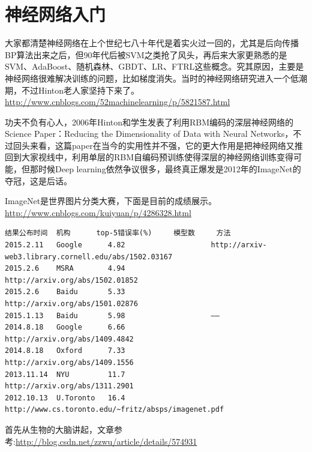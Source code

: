 \chapter{神经网络入门}

大家都清楚神经网络在上个世纪七八十年代是着实火过一回的，尤其是后向传播BP算法出来之后，但90年代后被SVM之类抢了风头，再后来大家更熟悉的是SVM、AdaBoost、随机森林、GBDT、LR、FTRL这些概念。究其原因，主要是神经网络很难解决训练的问题，比如梯度消失。当时的神经网络研究进入一个低潮期，不过Hinton老人家坚持下来了。\url{http://www.cnblogs.com/52machinelearning/p/5821587.html}

功夫不负有心人，2006年Hinton和学生发表了利用RBM编码的深层神经网络的Science Paper：Reducing the Dimensionality of Data with Neural Networks，不过回头来看，这篇paper在当今的实用性并不强，它的更大作用是把神经网络又推回到大家视线中，利用单层的RBM自编码预训练使得深层的神经网络训练变得可能，但那时候Deep learning依然争议很多，最终真正爆发是2012年的ImageNet的夺冠，这是后话。

ImageNet是世界图片分类大赛，下面是目前的成绩展示。\url{http://www.cnblogs.com/kuiyuan/p/4286328.html}
\begin{verbatim}
结果公布时间 	机构		top-5错误率(%) 	模型数 	方法
2015.2.11 	Google 		4.82 	  				http://arxiv-web3.library.cornell.edu/abs/1502.03167
2015.2.6 	MSRA 		4.94 	  				http://arxiv.org/abs/1502.01852
2015.2.6 	Baidu 		5.33 	  				http://arxiv.org/abs/1501.02876
2015.1.13 	Baidu 		5.98 	  				——
2014.8.18 	Google 		6.66 	  				http://arxiv.org/abs/1409.4842
2014.8.18 	Oxford 		7.33 	 			 	http://arxiv.org/abs/1409.1556
2013.11.14 	NYU 		11.7 	  				http://arxiv.org/abs/1311.2901
2012.10.13 	U.Toronto 	16.4 	  				http://www.cs.toronto.edu/~fritz/absps/imagenet.pdf
\end{verbatim}


首先从生物的大脑讲起，文章参考:\url{http://blog.csdn.net/zzwu/article/details/574931}
